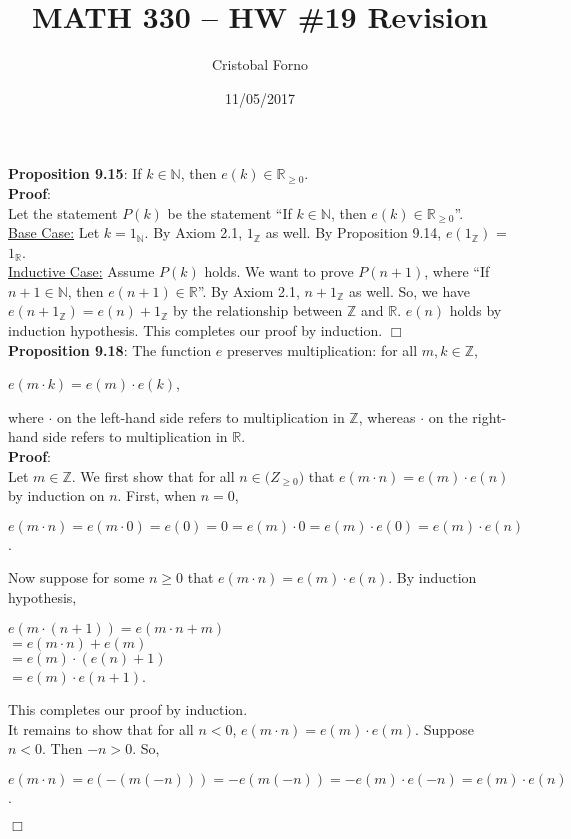 \documentclass[12pt]{article}
\title{MATH 330 -- HW \#19 Revision}
\author{Cristobal Forno}
\date{11/05/2017}
\begin{document}
\maketitle

\noindent
\textbf{Proposition 9.15}: If $k \in \mathbb{N}$, then $e(k) \in
\mathbb{R}_{\geq0}$.\\

\noindent
\textbf{Proof}:\\
Let the statement $P(k)$ be the statement ``If $k \in \mathbb{N}$, then  $e(k) \in
\mathbb{R}_{\geq0}$''.\\
\underline{Base Case:} Let $k=1_{\mathbb{N}}$. By Axiom 2.1, $1_{\mathbb{Z}}$ as
well. By Proposition 9.14, $e(1_{\mathbb{Z}})$ = $1_{\mathbb{R}}$.\\
\underline{Inductive Case:} Assume $P(k)$ holds. We want to prove $P(n+1)$,
where ``If $n+1 \in \mathbb{N}$, then $e(n+1) \in \mathbb{R}$''. By
Axiom 2.1, $n+1_{\mathbb{Z}}$ as well. So, we have $e(n+1_{\mathbb{Z}}) = e(n) +
1_{\mathbb{Z}}$ by the relationship between $\mathbb{Z}$ and $\mathbb{R}$.
$e(n)$ holds by induction hypothesis. This completes our proof by induction. 
$\Box$\\

\noindent
\textbf{Proposition 9.18}: The function $e$ preserves multiplication: for all
$m, k \in \mathbb{Z}$,
\begin{center}
  $e(m \cdot k) = e(m) \cdot e(k)$, 
\end{center}
where $\cdot$ on the left-hand side refers to multiplication in $\mathbb{Z}$,
whereas $\cdot$ on the right-hand side refers to multiplication in $\mathbb{R}$.\\
\noindent
\textbf{Proof}:\\
Let $m \in \mathbb{Z}$. We first show that for all $n \in \mathbb(Z_{\geq0})$ that
$e(m \cdot n) = e(m) \cdot e(n)$ by induction on $n$. First, when $n=0$,
\begin{center}
  $e(m \cdot n) = e(m \cdot 0) = e(0) = 0 = e(m) \cdot 0 = e(m) \cdot e(0) =
  e(m) \cdot e(n)$.
\end{center}
Now suppose for some $n \geq 0$ that $e(m \cdot n) = e(m) \cdot e(n)$. By induction hypothesis,
\begin{center}
  $e(m \cdot (n+1)) = e(m \cdot n + m)$ \\ $= e(m \cdot n) + e(m)$ \\ $= e(m)
  \cdot (e(n) + 1)$ \\ $= e(m) \cdot e(n + 1)$.
\end{center}
\noindent
This completes our proof by induction.\\
It remains to show that for all $n < 0$, $e(m \cdot n) = e(m) \cdot e(m)$.
Suppose $n < 0$. Then $-n > 0$. So,
\begin{center}
  $e(m \cdot n) = e(-(m(-n))) = -e(m(-n)) = -e(m) \cdot e(-n) = e(m) \cdot e(n)$.
\end{center}
$\Box$
\end{document}
